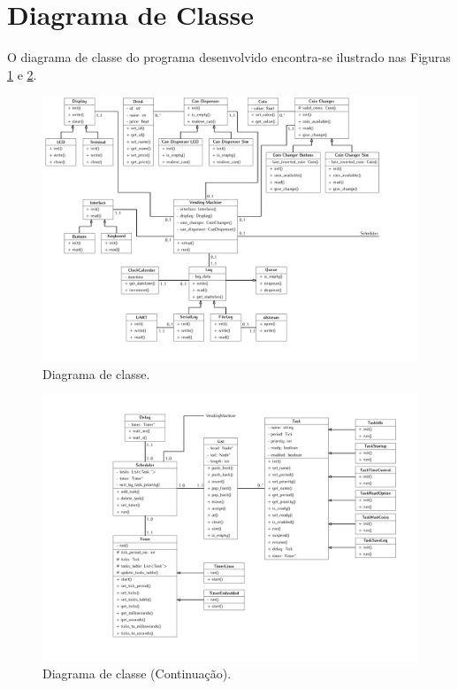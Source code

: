 %
%
%
%
%

%
%
%
%
%

\section{Diagrama de Classe} \label{sec:class_diagrams}

O diagrama de classe do programa desenvolvido encontra-se ilustrado nas Figuras \ref{fig:class_diagram} e \ref{fig:class_diagram_os}.

\begin{figure}[!ht]
    \begin{center}
        \includegraphics[width=\columnwidth]{figures/class_diagram.pdf}
        \caption{Diagrama de classe.}
        \label{fig:class_diagram}
    \end{center}
\end{figure}

\begin{figure}[!ht]
    \begin{center}
        \includegraphics[width=\columnwidth]{figures/class_diagram_os.pdf}
        \caption{Diagrama de classe (Continuação).}
        \label{fig:class_diagram_os}
    \end{center}
\end{figure}
